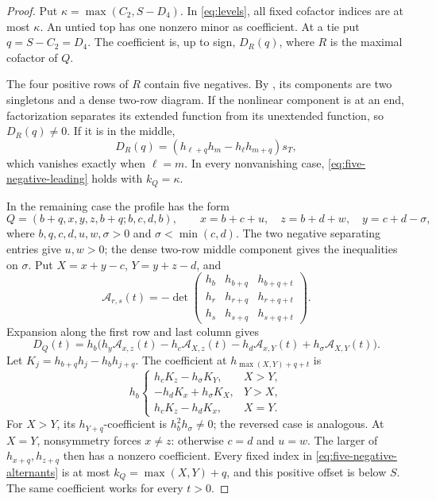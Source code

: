 \documentclass[11pt,a4paper]{amsart}
\numberwithin{equation}{section}
\theoremstyle{plain}
\theoremstyle{definition}
\begin{document}
\begin{proof}
Put \(\kappa=\max(C_2,S-D_4)\).  In \eqref{eq:levels}, all fixed
cofactor indices are at most \(\kappa\).  An untied top has one
nonzero minor as coefficient.  At a tie put \(q=S-C_2=D_4\).
The coefficient is, up to sign, \(D_R(q)\), where \(R\) is the
maximal cofactor of \(Q\).

The four positive rows of \(R\) contain five negatives.  By
, its components are
two singletons and a dense two-row diagram.  If the nonlinear component
is at an end, factorization separates its extended function from its
unextended function, so \(D_R(q)\ne0\).  If it is in the middle,
\[
 D_R(q)=(h_{\ell+q}h_m-h_\ell h_{m+q})s_T,
\]
which vanishes exactly when \(\ell=m\).  In every nonvanishing case,
\eqref{eq:five-negative-leading} holds with \(k_Q=\kappa\).

In the remaining case the profile has the form
\[
 Q=(b+q,x,y,z,b+q;b,c,d,b),\qquad
 x=b+c+u,\quad z=b+d+w,\quad y=c+d-\sigma,
\]
where \(b,q,c,d,u,w,\sigma>0\) and \(\sigma<\min(c,d)\).
The two negative separating entries give \(u,w>0\); the dense two-row
middle component gives the inequalities on \(\sigma\).
Put \(X=x+y-c\), \(Y=y+z-d\), and
\[
 \mathcal A_{r,s}(t)=-\det\begin{pmatrix}
 h_b&h_{b+q}&h_{b+q+t}\\
 h_r&h_{r+q}&h_{r+q+t}\\
 h_s&h_{s+q}&h_{s+q+t}
 \end{pmatrix}.
\]
Expansion along the first row and last column gives
\begin{equation}\label{eq:five-negative-alternants}
 D_Q(t)=h_b\bigl(h_y\mathcal A_{x,z}(t)
 -h_c\mathcal A_{X,z}(t)-h_d\mathcal A_{x,Y}(t)
 +h_\sigma\mathcal A_{X,Y}(t)\bigr).
\end{equation}
Let \(K_j=h_{b+q}h_j-h_bh_{j+q}\).  The coefficient at
\(h_{\max(X,Y)+q+t}\) is
\[
 h_b\begin{cases}
 h_cK_z-h_\sigma K_Y,&X>Y,\\
 -h_dK_x+h_\sigma K_X,&Y>X,\\
 h_cK_z-h_dK_x,&X=Y.
 \end{cases}
\]
For \(X>Y\), its \(h_{Y+q}\)-coefficient is
\(h_b^2h_\sigma\ne0\); the reversed case is analogous.
At \(X=Y\), nonsymmetry forces \(x\ne z\): otherwise \(c=d\)
and \(u=w\).  The larger of \(h_{x+q},h_{z+q}\) then has a nonzero
coefficient.  Every fixed index in \eqref{eq:five-negative-alternants}
is at most \(k_Q=\max(X,Y)+q\), and this positive offset is below
\(S\).  The same coefficient works for every \(t>0\).
\end{proof}
\end{document}
